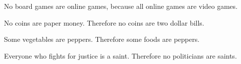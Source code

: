 \begin{exercises}
\item No board games are online games, because all online games are video games.


\item No coins are paper money. Therefore no coins are two dollar bills.


\item Some vegetables are peppers. Therefore some foods are peppers.



\item Everyone who fights for justice is a saint. Therefore no politicians are saints.
%



\end{exercises}
